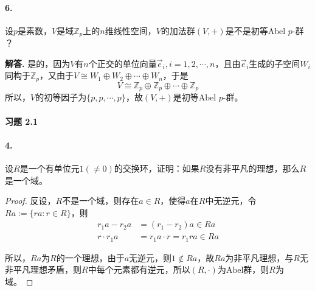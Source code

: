 \documentclass[12pt, a4paper, oneside]{ctexart}
\newenvironment{solution}{\par\noindent\textbf{解答. }}{\bigskip\par}
\begin{document}
\paragraph{6.}设$p$是素数，$V$是域$\mathbb{Z}_p$上的$n$维线性空间，$V$的加法群$(V,+)$是不是初等$\text{Abel }p\text{-群}$？

\begin{solution}
    是的，因为$V$有$n$个正交的单位向量$\vec{e}_i,i=1,2,\cdots,n$，且由$\vec{e}_i$生成的子空间$W_i$同构于$\mathbb{Z}_{p}$，又由于$V\cong W_1\oplus W_2\oplus\cdots\oplus W_n$，于是
    \begin{equation*}
        V\cong\mathbb{Z}_{p}\oplus\mathbb{Z}_{p}\oplus\cdots\oplus\mathbb{Z}_{p}
    \end{equation*}
    所以，$V$的初等因子为$\{p,p,\cdots,p\}$，故$(V,+)$是初等$\text{Abel }p\text{-群}$。
\end{solution}
\paragraph{习题 2.1}
\paragraph{4.}设$R$是一个有单位元$1(\neq 0)$的交换环，证明：如果$R$没有非平凡的理想，那么$R$是一个域。
\begin{proof}
    反设，$R$不是一个域，则存在$a\in R$，使得$a$在$R$中无逆元，令$Ra:=\{ra:r\in R\}$，则
    \begin{equation*}
        \begin{aligned}
            r_1a-r_2a &= (r_1-r_2)a\in Ra\\
            r\cdot r_1a &= r_1a\cdot r = r_1ra\in Ra
        \end{aligned}
    \end{equation*}

    所以，$Ra$为$R$的一个理想，由于$a$无逆元，则$1\notin Ra$，故$Ra$为非平凡理想，与$R$无非平凡理想矛盾，则$R$中每个元素都有逆元，所以$(R,\cdot)$为$\text{Abel}$群，则$R$为域。
\end{proof}
\end{document}
